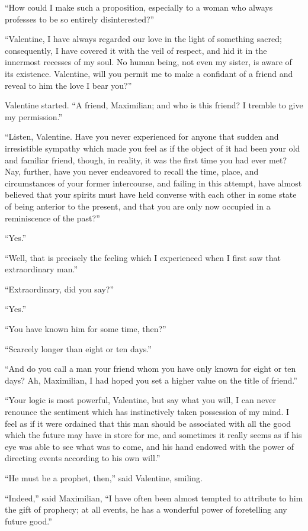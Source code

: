 “How could I make such a proposition, especially to a woman who always
professes to be so entirely disinterested?”

“Valentine, I have always regarded our love in the light of something
sacred; consequently, I have covered it with the veil of respect, and
hid it in the innermost recesses of my soul. No human being, not even
my sister, is aware of its existence. Valentine, will you permit me to
make a confidant of a friend and reveal to him the love I bear you?”

Valentine started. “A friend, Maximilian; and who is this friend? I
tremble to give my permission.”

“Listen, Valentine. Have you never experienced for anyone that sudden
and irresistible sympathy which made you feel as if the object of it
had been your old and familiar friend, though, in reality, it was the
first time you had ever met? Nay, further, have you never endeavored to
recall the time, place, and circumstances of your former intercourse,
and failing in this attempt, have almost believed that your spirits
must have held converse with each other in some state of being anterior
to the present, and that you are only now occupied in a reminiscence of
the past?”

“Yes.”

“Well, that is precisely the feeling which I experienced when I first
saw that extraordinary man.”

“Extraordinary, did you say?”

“Yes.”

“You have known him for some time, then?”

“Scarcely longer than eight or ten days.”

“And do you call a man your friend whom you have only known for eight
or ten days? Ah, Maximilian, I had hoped you set a higher value on the
title of friend.”

“Your logic is most powerful, Valentine, but say what you will, I can
never renounce the sentiment which has instinctively taken possession
of my mind. I feel as if it were ordained that this man should be
associated with all the good which the future may have in store for me,
and sometimes it really seems as if his eye was able to see what was to
come, and his hand endowed with the power of directing events according
to his own will.”

“He must be a prophet, then,” said Valentine, smiling.

“Indeed,” said Maximilian, “I have often been almost tempted to
attribute to him the gift of prophecy; at all events, he has a
wonderful power of foretelling any future good.”

